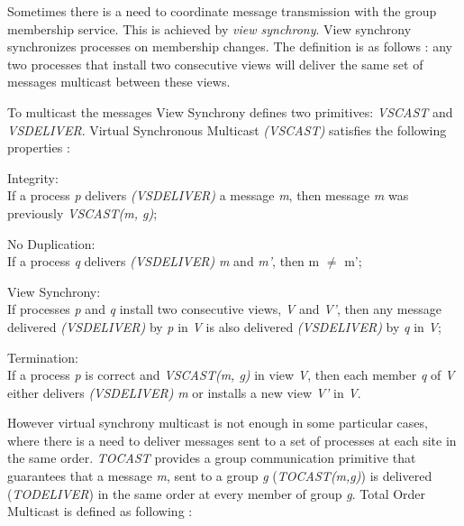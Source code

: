 Sometimes there is a need to coordinate message transmission with the group membership service. This is achieved by \textit{view synchrony}. View synchrony synchronizes processes on membership changes. The definition is as follows \cite{Chockler:2001:GCS:503112.503113}: any two processes that install two consecutive views will deliver the same set of messages multicast between these views.

To multicast the messages View Synchrony defines two primitives: \textit{VSCAST} and \textit{VSDELIVER}. Virtual Synchronous Multicast \textit{(VSCAST)} satisfies the following properties \cite{Chockler:2001:GCS:503112.503113}:

\begin{description}
	\item Integrity:\\
		If a process \textit{p} delivers \textit{(VSDELIVER)} a message \textit{m}, then message \textit{m} was previously \textit{VSCAST(m, g)};
	\item No Duplication:\\
		If a process \textit{q} delivers \textit{(VSDELIVER)} \textit{m} and \textit{m'}, then {m $\neq$ m'};
	\item View Synchrony:\\
		If processes \textit{p} and \textit{q} install two consecutive views, \textit{V} and \textit{V'}, then any message delivered \textit{(VSDELIVER)} by \textit{p} in \textit{V} is also delivered \textit{(VSDELIVER)} by \textit{q} in \textit{V};
	\item Termination:\\
		If a process \textit{p} is correct and \textit{VSCAST(m, g)} in view \textit{V}, then each member \textit{q} of \textit{V} either delivers \textit{(VSDELIVER)} \textit{m} or installs a new view \textit{V'} in \textit{V}.
\end{description}


However virtual synchrony multicast is not enough in some particular cases, where there is a need to deliver messages sent to a set of processes at each site in the same order. \textit{TOCAST} provides a group communication primitive that guarantees that a message \textit{m}, sent to a group \textit{g} (\textit{TOCAST(m,g)}) is delivered (\textit{TODELIVER}) in the same order at every member of group \textit{g}.
Total Order Multicast is defined as following \cite{Defago:2004:TOB:1041680.1041682}:

